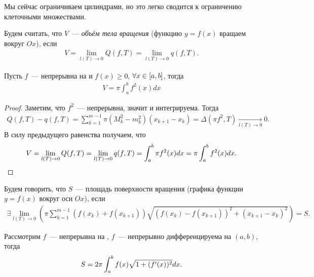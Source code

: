\documentclass[../main.tex]{subfiles}
\begin{document}
\begin{note}
    Мы сейчас ограничиваем цилиндрами, но это легко сводится к ограничению клеточными множествами.
\end{note}

\begin{definition}
    Будем считать, что $V$~--- \emph{объём тела вращения} (функцию $y=f(x)$ вращаем вокруг $Ox$), если 
    \begin{gather} 
      V = \lim_{l(T) \to 0} Q(f, T) = \lim_{l(T) \to 0} q(f,T).
    \end{gather}
\end{definition}

\begin{proposition}
    Пусть $f$~--- непрерывна на \segab\space и $f(x)\geq 0$, $\forall x \in [a,b]$, тогда 
    \begin{gather} 
      V = \pi \int_{a}^{b} f^{2}(x) dx
    \end{gather}  
\end{proposition}

\begin{proof}
    Заметим, что $f^{2}$~--- непрерывна, значит и интегрируема. Тогда 
    \begin{gather} 
       Q(f,T) - q(f, T) = \sum_{k=1}^{m-1} \pi(M^{2}_k - m^{2}_k) (x_{k+1}-x_{k})  = \Delta(\pi f^{2}, T) \xrightarrow[l(T) \to  0 ]{} 0 .
    \end{gather}
    В силу предыдущего равенства получаем, что 
    \begin{gather}
        V = \lim_{l(T) \to 0} Q(f, T) = \lim_{l(T) \to 0} q(f,T) = \int_a^b \pi f^{2}(x)dx = \pi \int_a^b f^{2}(x) dx.
    \end{gather}
\end{proof}

\begin{definition}
    Будем говорить, что $S$~--- площадь поверхности вращения (графика функции $y=f(x)$ вокруг оси $Ox$), если 
    \begin{gather} 
      \exists \lim_{l(T) \to 0} \left(\pi \sum_{k=1}^{m-1} (f(x_k) + f(x_{k+1})) \sqrt{(f(x_k)-f(x_{k+1}))^2 + (x_{k+1}-x_{k})^2}\right) =S.
    \end{gather}
\end{definition}

\begin{proposition}
    Рассмотрим $f$~--- непрерывна на \segab, $f$~--- непрерывно дифференцируема на $(a,b)$, тогда 
    \begin{gather} 
      S = 2\pi \int_a^b f(x)\sqrt{1+(f'(x))^2} dx.
    \end{gather}
\end{proposition}
\end{document}

